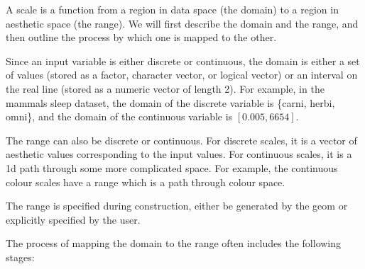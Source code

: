A scale is a function from a region in data space (the domain) to a region in aesthetic space (the range).  We will first describe the domain and the range, and then outline the process by which one is mapped to the other.

Since an input variable is either discrete or continuous, the domain is either a set of values (stored as a factor, character vector, or logical vector) or an interval on the real line (stored as a numeric vector of length 2). For example, in the mammals sleep dataset, the domain of the discrete variable  is \{carni, herbi, omni\}, and the domain of the continuous variable  is $[0.005, 6654]$.

The range can also be discrete or continuous.  For discrete scales, it is a vector of aesthetic values corresponding to the input values. For continuous scales, it is a 1d path through some more complicated space.  For example, the continuous colour scales have a range which is a path through colour space.

The range is specified during construction, either be generated by the geom or explicitly specified by the user. 

The process of mapping the domain to the range often includes the following stages:

